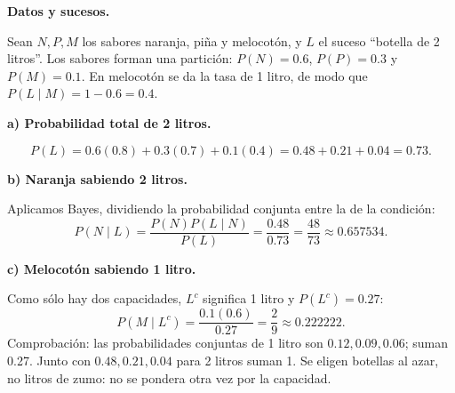 \textbf{Datos y sucesos.}\par\nopagebreak[4]
Sean $N,P,M$ los sabores naranja, piña y melocotón, y $L$ el suceso ``botella de 2 litros''. Los sabores forman una partición: $P(N)=0.6$, $P(P)=0.3$ y $P(M)=0.1$. En melocotón se da la tasa de 1 litro, de modo que $P(L\mid M)=1-0.6=0.4$.

\textbf{a) Probabilidad total de 2 litros.}\par\nopagebreak[4]
\[
P(L)=0.6(0.8)+0.3(0.7)+0.1(0.4)
=0.48+0.21+0.04=\boxed{0.73}.
\]

\textbf{b) Naranja sabiendo 2 litros.}\par\nopagebreak[4]
Aplicamos Bayes, dividiendo la probabilidad conjunta entre la de la condición:
\[
P(N\mid L)=\frac{P(N)P(L\mid N)}{P(L)}
=\frac{0.48}{0.73}=\boxed{\frac{48}{73}\approx0.657534}.
\]

\textbf{c) Melocotón sabiendo 1 litro.}\par\nopagebreak[4]
Como sólo hay dos capacidades, $L^c$ significa 1 litro y $P(L^c)=0.27$:
\[
P(M\mid L^c)=\frac{0.1(0.6)}{0.27}
=\boxed{\frac29\approx0.222222}.
\]
Comprobación: las probabilidades conjuntas de 1 litro son $0.12,0.09,0.06$; suman 0.27. Junto con $0.48,0.21,0.04$ para 2 litros suman 1. Se eligen botellas al azar, no litros de zumo: no se pondera otra vez por la capacidad.
